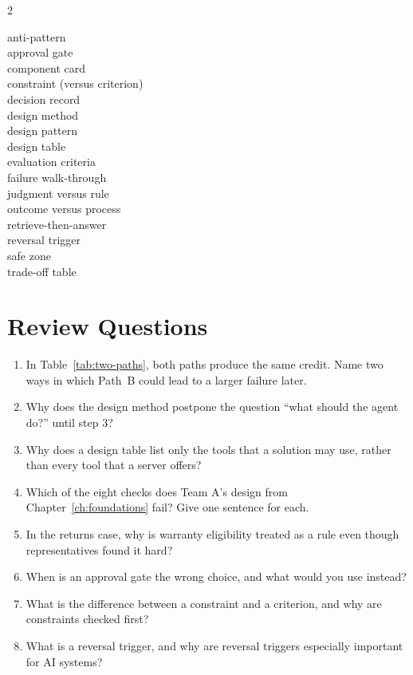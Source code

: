 \begin{multicols}{2}
\raggedright\small
anti-pattern \\
approval gate \\
component card \\
constraint (versus criterion) \\
decision record \\
design method \\
design pattern \\
design table \\
evaluation criteria \\
failure walk-through \\
judgment versus rule \\
outcome versus process \\
retrieve-then-answer \\
reversal trigger \\
safe zone \\
trade-off table
\end{multicols}

\section*{Review Questions}

\begin{enumerate}[itemsep=2pt]
  \item In Table~\ref{tab:two-paths}, both paths produce the same credit. Name two ways in which Path~B could lead to a larger failure later.
  \item Why does the design method postpone the question ``what should the agent do?'' until step 3?
  \item Why does a design table list only the tools that a solution may use, rather than every tool that a server offers?
  \item Which of the eight checks does Team A's design from Chapter~\ref{ch:foundations} fail? Give one sentence for each.
  \item In the returns case, why is warranty eligibility treated as a rule even though representatives found it hard?
  \item When is an approval gate the wrong choice, and what would you use instead?
  \item What is the difference between a constraint and a criterion, and why are constraints checked first?
  \item What is a reversal trigger, and why are reversal triggers especially important for AI systems?
\end{enumerate}

